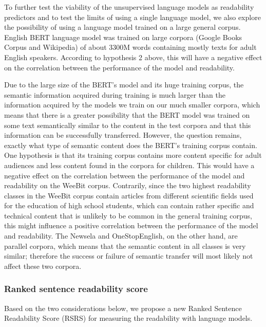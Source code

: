 \documentclass{clv3}
\begin{document}
To further test the viability of the unsupervised language models as readability predictors and to test the limits of using a single language model, we also explore the possibility of using a language model trained on a large general corpus. English BERT language model was trained on large corpora (Google Books Corpus \citep{goldberg2013dataset} and Wikipedia) of about 3300M words containing mostly texts for adult English speakers. According to hypothesis 2 above, this will have a negative effect on the correlation between the performance of the model and readability.

Due to the large size of the BERT's model and its huge training corpus, the semantic information acquired during training is much larger than the information acquired by the models we train on our much smaller corpora, which means that there is a greater possibility that the BERT model was trained on some text semantically similar to the content in the test corpora and that this information can be successfully transferred. However, the question remains, exactly what type of semantic content does the BERT's training corpus contain. One hypothesis is that its training corpus contains more content specific for adult audiences and less content found in the corpora for children. This would have a negative effect on the correlation between the performance of the model and readability on the WeeBit corpus. Contrarily, since the two highest readability classes in the WeeBit corpus contain articles from different scientific fields used for the education of high school students, which can contain rather specific and technical content that is unlikely to be common in the general training corpus, this might influence a positive correlation between the performance of the model and readability. The Newsela and OneStopEnglish, on the other hand, are parallel corpora, which means that the semantic content in all classes is very similar; therefore the success or failure of semantic transfer will most likely not affect these two corpora.

\subsubsection{Ranked sentence readability score}

Based on the two considerations below, we propose a new Ranked Sentence Readability Score (RSRS) for measuring the readability with language models.
\end{document}

